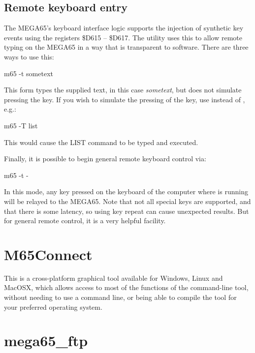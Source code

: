 \subsection{Remote keyboard entry}

The MEGA65's keyboard interface logic supports the injection of
synthetic key events using the registers \$D615 -- \$D617.
The  utility uses this to allow remote typing on the MEGA65
in a way that is transparent to software.  There are three ways to use
this:

\begin{screenoutput}
m65 -t sometext
\end{screenoutput}

This form types the supplied text, in this case {\em sometext}, but
does not simulate pressing the  key.  If you wish
to simulate the pressing of the  key, use 
instead of , e.g.:

\begin{screenoutput}
m65 -T list
\end{screenoutput}

This would cause the LIST command to be typed and executed.

Finally, it is possible to begin general remote keyboard control via:

\begin{screenoutput}
m65 -t -
\end{screenoutput}

In this mode, any key pressed on the keyboard of the computer
where  is running will be relayed to the MEGA65.  Note that
not all special keys are supported, and that there is some latency, so
using key repeat can cause unexpected results.  But for general remote
control, it is a very helpful facility.


\section{M65Connect}

This is a cross-platform graphical tool available for Windows, Linux
and MacOSX, which allows access to most of the functions of
the  command-line tool, without needing to use a
command line, or being able to compile the tool for your preferred
operating system.

\section{mega65\_ftp}

